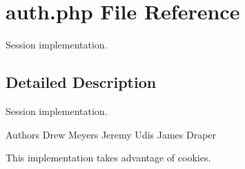 \hypertarget{auth_8php}{}\section{auth.\+php File Reference}
\label{auth_8php}


Session implementation.  




\subsection{Detailed Description}
Session implementation. 

\begin{DoxyAuthor}{Authors}
Drew Meyers Jeremy Udis James Draper
\end{DoxyAuthor}
This implementation takes advantage of cookies. 